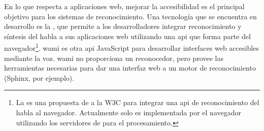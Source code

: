 En lo que respecta a aplicaciones web, mejorar la accesibilidad es el principal objetivo para 
los sistemas de reconocimiento. Una tecnolog\'ia que se encuentra en desarrollo es la 
 \cite{GoogleWebSpeechAPI}, que permite a los desarrolladores integrar 
reconocimiento y s\'intesis del habla a sus aplicaciones web utilizando una \gls{api} que forma parte 
del navegador\footnote{La  es una propuesta de  a la W3C para integrar
una \gls{api} de reconocimiento del habla al navegador. Actualmente solo es implementada por el navegador
 utilizando los servidores de  para el procesamiento.}.
\gls{wami} \cite{GruensteinWami2008, WamiHome} es otra \gls{api} JavaScript para desarrollar interfaces web 
accesibles mediante la voz. \gls{wami} no proporciona un reconocedor, pero provee las herramientas necesarias 
para dar una interfaz web a un motor de reconocimiento (Sphinx, por ejemplo).